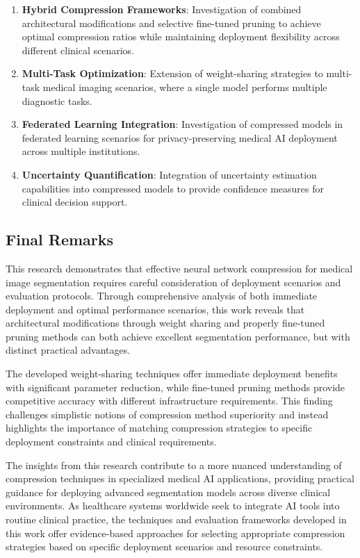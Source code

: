 \documentclass[12pt,a4paper]{article}
\begin{document}
\begin{enumerate}
\begin{enumerate}
\item \textbf{Hybrid Compression Frameworks}: Investigation of combined architectural modifications and selective fine-tuned pruning to achieve optimal compression ratios while maintaining deployment flexibility across different clinical scenarios.

\item \textbf{Multi-Task Optimization}: Extension of weight-sharing strategies to multi-task medical imaging scenarios, where a single model performs multiple diagnostic tasks.

\item \textbf{Federated Learning Integration}: Investigation of compressed models in federated learning scenarios for privacy-preserving medical AI deployment across multiple institutions.

\item \textbf{Uncertainty Quantification}: Integration of uncertainty estimation capabilities into compressed models to provide confidence measures for clinical decision support.
\end{enumerate}

\subsection{Final Remarks}

This research demonstrates that effective neural network compression for medical image segmentation requires careful consideration of deployment scenarios and evaluation protocols. Through comprehensive analysis of both immediate deployment and optimal performance scenarios, this work reveals that architectural modifications through weight sharing and properly fine-tuned pruning methods can both achieve excellent segmentation performance, but with distinct practical advantages.

The developed weight-sharing techniques offer immediate deployment benefits with significant parameter reduction, while fine-tuned pruning methods provide competitive accuracy with different infrastructure requirements. This finding challenges simplistic notions of compression method superiority and instead highlights the importance of matching compression strategies to specific deployment constraints and clinical requirements.

The insights from this research contribute to a more nuanced understanding of compression techniques in specialized medical AI applications, providing practical guidance for deploying advanced segmentation models across diverse clinical environments. As healthcare systems worldwide seek to integrate AI tools into routine clinical practice, the techniques and evaluation frameworks developed in this work offer evidence-based approaches for selecting appropriate compression strategies based on specific deployment scenarios and resource constraints.


\end{enumerate}
\end{document}
